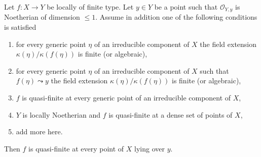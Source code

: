 \begin{lemma}
\label{lemma-quasi-finite-in-codim-1}
Let $f : X \to Y$ be locally of finite type. Let $y \in Y$ be a point
such that $\mathcal{O}_{Y, y}$ is Noetherian of dimension $\leq 1$.
Assume in addition one of the following conditions is satisfied
\begin{enumerate}
\item for every generic point $\eta$ of an irreducible component
of $X$ the field extension $\kappa(\eta)/\kappa(f(\eta))$
is finite (or algebraic),
\item for every generic point $\eta$ of an irreducible component
of $X$ such that $f(\eta) \leadsto y$ the field extension
$\kappa(\eta)/\kappa(f(\eta))$ is finite (or algebraic),
\item $f$ is quasi-finite at every generic point of an
irreducible component of $X$,
\item $Y$ is locally Noetherian and $f$
is quasi-finite at a dense set of points of $X$,
\item add more here.
\end{enumerate}
Then $f$ is quasi-finite at every point of $X$ lying over $y$.
\end{lemma}

